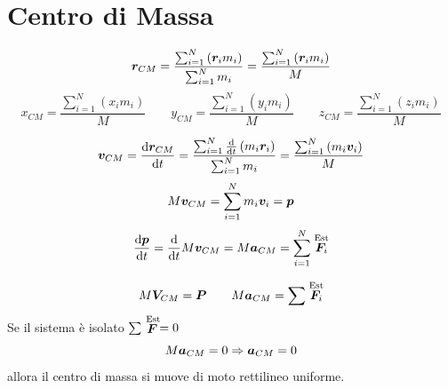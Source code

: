 \section{Centro di Massa}
\begin{Def}
\begin{equation}\boldsymbol{r}_{CM}=\frac{\sum^N_{i=1}\left(\boldsymbol{r}_im_i\right)}{\sum^N_{i=1}m_i}=\frac{\sum^N_{i=1}\left(\boldsymbol{r}_im_i\right)}{M}\end{equation}
\begin{equation*}x_{CM}=\frac{\sum^N_{i=1}\left(x_im_i\right)}{M} \qquad
y_{CM}=\frac{\sum^N_{i=1}\left(y_im_i\right)}{M}\qquad
z_{CM}=\frac{\sum^N_{i=1}\left(z_im_i\right)}{M}\end{equation*}
\end{Def}
\begin{equation*}\boldsymbol{v}_{CM}=\frac{\mathrm{d} \boldsymbol{r}_{CM}}{\mathrm{d} t}=\frac{\sum^N_{i=1}\frac{\mathrm{d}}{\mathrm{d} t}\left(m_i\boldsymbol{r}_i\right)}{\sum^N_{i=1}m_i}=\frac{\sum^N_{i=1}\left(m_i\boldsymbol{v}_i\right)}{M}\end{equation*}
\begin{equation*}M\boldsymbol{v}_{CM}={\sum^N_{i=1}m_i\boldsymbol{v}_i}=\boldsymbol{p}\end{equation*}
\begin{equation*}\frac{\mathrm{d} \boldsymbol{p}}{\mathrm{d} t}=\frac{\mathrm{d}}{\mathrm{d} t}M\boldsymbol{v}_{CM}=M\boldsymbol{a}_{CM}=\sum^N_{i=1}\stackrel{\text{Est}}{\boldsymbol{F}_i}\end{equation*}
\begin{Teo}
\begin{equation}M\boldsymbol{V}_{CM}=\boldsymbol{P} \qquad M\boldsymbol{a}_{CM}=\sum \stackrel{\text{Est}}{\boldsymbol{F}_i}\end{equation}
Se il sistema è isolato $\sum \stackrel{\text{Est}}{\boldsymbol{F}}=0$
\begin{equation*}M\boldsymbol{a}_{CM}=0 \Rightarrow \boldsymbol{a}_{CM}=0\end{equation*}
allora il centro di massa si muove di moto rettilineo uniforme.
\end{Teo}

